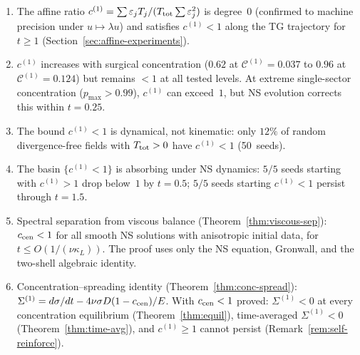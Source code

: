\documentclass[11pt]{article}
\theoremstyle{definition}
\newcommand{\cC}{\mathcal{C}}
\begin{document}
\begin{enumerate}[leftmargin=2em,label=(N\arabic*)]
  contribution to $d\cC^{(1)}/dt$ is positive
  (concentrating) and comparable in magnitude to
  $|\Sigma^{(1)}|$ at all times
  ($|\text{visc}/\text{NL}|\approx 1.0$).
  The constitutive coefficient $g^{(1)}$ is degree~1
  in $u$, not dimensionless: it varies by $2\times$
  across viscosities and $27\%$ between $128^3$ and
  $256^3$ at the same $\nu$.
\item The affine ratio
  $c^{(1)}=\sum\varepsilon_jT_j/(T_{\rm tot}\sum\varepsilon_j^2)$
  is degree~0 (confirmed to machine precision under
  $u\mapsto\lambda u$) and satisfies $c^{(1)}<1$ along
  the TG trajectory for $t\geq 1$
  (Section~\ref{sec:affine-experiments}).
\item $c^{(1)}$ increases with surgical concentration
  ($0.62$ at $\cC^{(1)}=0.037$ to $0.96$ at
  $\cC^{(1)}=0.124$) but remains $<1$ at all tested
  levels.  At extreme single-sector concentration
  ($p_{\max}>0.99$), $c^{(1)}$ can exceed~$1$, but
  NS evolution corrects this within $t=0.25$.
\item The bound $c^{(1)}<1$ is dynamical, not kinematic:
  only $12\%$ of random divergence-free fields with
  $T_{\rm tot}>0$ have $c^{(1)}<1$ (50~seeds).
\item The basin $\{c^{(1)}<1\}$ is absorbing under NS
  dynamics: $5/5$ seeds starting with $c^{(1)}>1$ drop
  below~$1$ by $t=0.5$; $5/5$ seeds starting $c^{(1)}<1$
  persist through $t=1.5$.
\item Spectral separation from viscous balance
  (Theorem~\ref{thm:viscous-sep}): $c_{\rm cen}<1$
  for all smooth NS solutions with anisotropic
  initial data, for $t\leq O(1/(\nu\kappa_L))$.
  The proof uses only the NS equation, Gronwall,
  and the two-shell algebraic identity.
\item Concentration--spreading identity
  (Theorem~\ref{thm:conc-spread}):
  $\Sigma^{(1)} = d\sigma/dt
  - 4\nu\sigma D(1-c_{\rm cen})/E$.
  With $c_{\rm cen}<1$ proved: $\Sigma^{(1)}<0$ at
  every concentration equilibrium
  (Theorem~\ref{thm:equil}), time-averaged
  $\Sigma^{(1)}<0$ (Theorem~\ref{thm:time-avg}),
  and $c^{(1)}\geq 1$ cannot persist
  (Remark~\ref{rem:self-reinforce}).
\end{enumerate}
\end{document}
